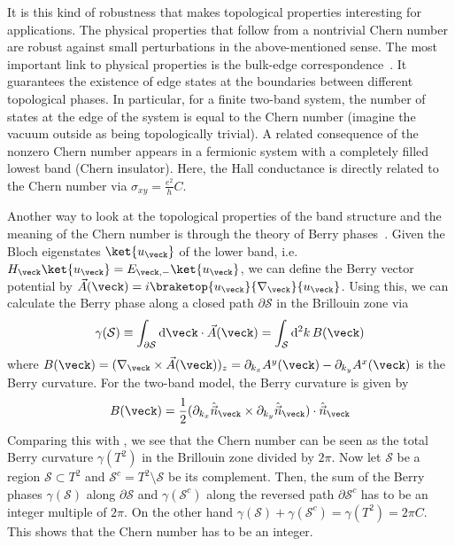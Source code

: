 It is this kind of robustness that makes topological properties interesting for applications.
The physical properties that follow from a nontrivial Chern number are robust against small perturbations in the above-mentioned sense.
The most important link to physical properties is the bulk-edge correspondence~\cite{Hatsugai1993}.
It guarantees the existence of edge states at the boundaries between different topological phases.
In particular, for a finite two-band system, the number of states at the edge of the system is equal to the Chern number (imagine the vacuum outside as being topologically trivial).
A related consequence of the nonzero Chern number appears in a fermionic system with a completely filled lowest band (Chern insulator).
Here, the Hall conductance is directly related to the Chern number via $\sigma_{xy} = \frac{e^2}{h} C$.

Another way to look at the topological properties of the band structure and the meaning of the Chern number is through the theory of Berry phases~\cite{Berry1984,Zak1989}.
Given the Bloch eigenstates $\ket{u_\veck}$ of the lower band, i.e.~$H_\veck\ket{u_\veck} = E_{\veck,-} \ket{u_\veck}$, we can define the Berry vector potential by
$\vec{A}(\veck) = i \braketop{u_\veck}{\nabla_\veck}{u_\veck}$.
Using this, we can calculate the Berry phase along a closed path $\partial\mathcal{S}$ in the Brillouin zone via
\begin{align}
    \gamma(\mathcal{S}) \equiv \int_{\partial\mathcal{S}} \mathrm{d}\veck \cdot \vec{A}(\veck) = \int_\mathcal{S} \mathrm{d}^2 k \, B(\veck)
\end{align}
where $B(\veck) = (\nabla_\veck \times \vec{A}(\veck))_z = \partial_{k_x} A^y(\veck) - \partial_{k_y} A^x(\veck)$ is the Berry curvature.
For the two-band model, the Berry curvature is given by
\begin{align}
    B(\veck) = \frac{1}{2} ( \partial_{k_x} \hat{\vec{n}}_{\veck} \times \partial_{k_y} \hat{\vec{n}}_{\veck} ) \cdot \hat{\vec{n}}_{\veck}
\end{align}
Comparing this with , we see that the Chern number can be seen as the total Berry curvature $\gamma(T^2)$ in the Brillouin zone divided by $2\pi$.
Now let $\mathcal{S}$ be a region $\mathcal{S} \subset T^2$ and $\mathcal{S}^c = T^2 \setminus \mathcal{S}$ be its complement.
Then, the sum of the Berry phases $\gamma(\mathcal{S})$ along $\partial \mathcal{S}$ and $\gamma(\mathcal{S}^c)$ along the reversed path $\partial \mathcal{S}^c$ has to be an integer multiple of $2\pi$.
On the other hand $\gamma(\mathcal{S}) + \gamma(\mathcal{S}^c) = \gamma(T^2) = 2\pi C$. This shows that the Chern number has to be an integer.


